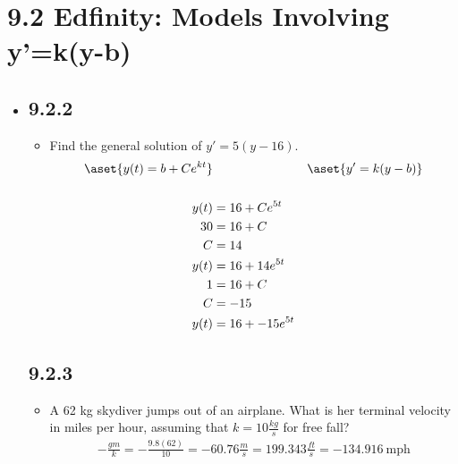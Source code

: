 
\section{9.2 Edfinity: Models Involving y'=k(y-b)}
\begin{itemize}
  \item []

    \subsection{9.2.2}
    \begin{itemize}
      \item Find the general solution of \( y'=5\left( y-16 \right)  \).
        \begin{align*}
          \aset{y(t) = b + Ce^{kt}} && \aset{y'=k(y-b)}\\ \\
          y(t) &= 16 + Ce^{5t} \\
          30 &= 16 + C \\
          C &= 14 \\
          y(t) &= 16 + 14e^{5t} \\
          1 &= 16 + C \\
          C &= -15 \\
          y(t) &= 16 + -15e^{5t}
        \end{align*}
    \end{itemize}

    \subsection{9.2.3}
    \begin{itemize}
      \item A 62 kg skydiver jumps out of an airplane. What is her terminal
        velocity in miles per hour, assuming that \( k = 10 \frac{kg}{s} \) for
        free fall?
        \begin{align*}
          -\frac{gm}{k} = -\frac{9.8(62)}{10} = -60.76 \tfrac{m}{s} = 199.343
          \tfrac{ft}{s} = -134.916~\text{mph}
        \end{align*}
    \end{itemize}


\end{itemize}
